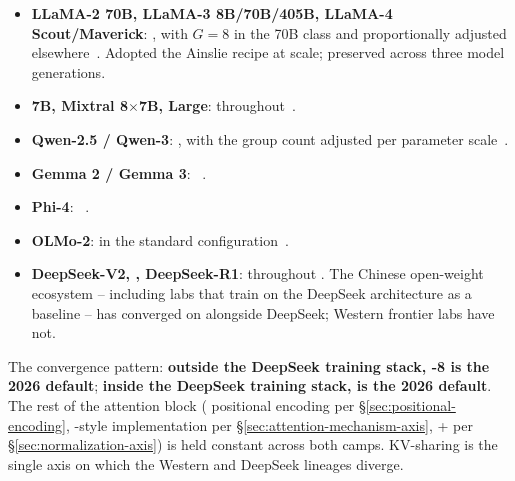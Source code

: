 \begin{itemize}
  \item \textbf{LLaMA-2 70B, LLaMA-3 8B/70B/405B, LLaMA-4 Scout/Maverick}:
    , with $G = 8$ in the 70B class and proportionally adjusted
    elsewhere~\citep{touvron2023, meta-llama3, meta-llama4}. Adopted
    the Ainslie recipe at scale; preserved across three model
    generations.
  \item \textbf{ 7B, Mixtral 8$\times$7B,  Large}:
     throughout~\citep{jiang2023}.
  \item \textbf{Qwen-2.5 / Qwen-3}: , with the group count
    adjusted per parameter scale~\citep{qwen3}.
  \item \textbf{Gemma 2 / Gemma 3}: ~\citep{gemma3}.
  \item \textbf{Phi-4}: ~\citep{phi4}.
  \item \textbf{OLMo-2}:  in the standard configuration~\citep{olmo2}.
  \item \textbf{DeepSeek-V2, , DeepSeek-R1}:  throughout
    \citep{deepseek-v2, deepseek-v3, deepseek-r1}. The Chinese
    open-weight ecosystem -- including labs that train on the
    DeepSeek architecture as a baseline -- has converged on 
    alongside DeepSeek; Western frontier labs have not.
\end{itemize}

The convergence pattern: \textbf{outside the DeepSeek training
stack, -8 is the 2026 default}; \textbf{inside the DeepSeek
training stack,  is the 2026 default}. The rest of the
attention block ( positional encoding per
\S\ref{sec:positional-encoding}, -style implementation
per \S\ref{sec:attention-mechanism-axis},  +  per
\S\ref{sec:normalization-axis}) is held constant across both camps.
KV-sharing is the single axis on which the Western and DeepSeek
lineages diverge.

